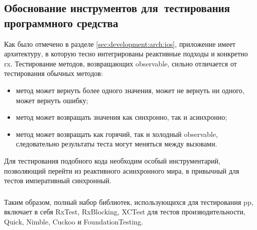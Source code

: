 \subsection{Обоснование инструментов для~тестирования программного средства}
\label{sec:testing:tech}

Как было отмечено в разделе \ref{sec:development:arch:ios}, приложение имеет архитектуру, в которую тесно интегрированы реактивные подходы и конкретно \gls{rx}. Тестирование методов, возвращающих \gls{observable}, сильно отличается от тестирования обычных методов:

\begin{itemize}
	\item метод может вернуть более одного значения, может не вернуть ни одного, может вернуть ошибку;
	\item метод может возвращать значения как синхронно, так и асинхронно;
	\item метод может возвращать как горячий, так и холодный \gls{observable}, следовательно результаты теста могут меняться между вызовами.
\end{itemize}

Для тестирования подобного кода необходим особый инструментарий, позволяющий перейти из реактивного асинхронного мира, в привычный для тестов императивный синхронный.




\subsubsection{}
\label{sec:testing:tech:result}
Таким образом, полный набор библиотек, использующихся для тестирования \gls{pp}, включает в себя RxTest, RxBlocking, XCTest для тестов производительности, Quick, Nimble, Cuckoo и FoundationTesting.
